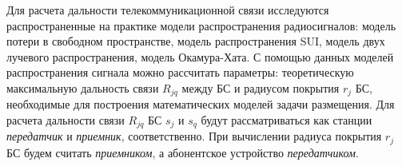 
Для расчета дальности телекоммуникационной связи исследуются распространенные на практике модели распространения радиосигналов: модель потери в свободном пространстве,  модель распространения SUI, модель двух лучевого распространения, модель Окамура-Хата. С помощью данных моделей распространения сигнала можно рассчитать параметры: теоретическую максимальную дальность связи $ R_{jq}$ между БС и радиусом покрытия $ r_j $ БС, необходимые для построения математических моделей задачи размещения. Для расчета дальности связи $R_{jq}$ БС $s_j$ и $s_q$ будут рассматриваться как станции \textit{передатчик} и \textit{приемник}, соответственно. При вычислении радиуса покрытия $r_j$ БС будем считать \textit{приемником}, а абонентское устройство \textit{передатчиком}.








